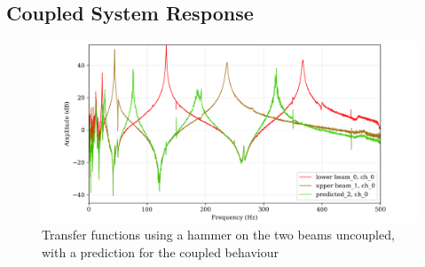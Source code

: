 \documentclass[twoside,onecolumn]{article}
\begin{document}
\subsection{Coupled System Response}
\begin{figure}[!htb]
  \centering
    \includegraphics[width=\linewidth]{6-coupled}
  \caption{Transfer functions using a hammer on the two beams uncoupled, with a prediction for the coupled behaviour }
  \label{fig:uncoupled}
\end{figure}
\end{document}

